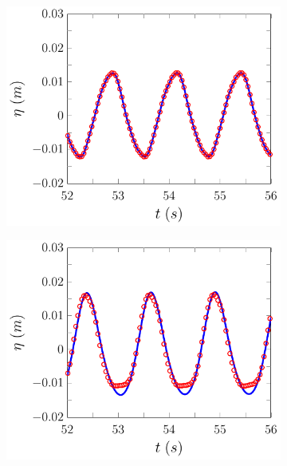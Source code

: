 \begin{figure}
	\centering
	\begin{subfigure}{0.5\textwidth}
		\includegraphics[width=\textwidth]{./chp6/figures/Experiment/Beji/sh/FEVMWG1.pdf}
		\vspace{0.5cm}
	\end{subfigure}%
	\begin{subfigure}{0.5\textwidth}
		\includegraphics[width=\textwidth]{./chp6/figures/Experiment/Beji/sh/FEVMWG2.pdf}
		\vspace{0.5cm}
	\end{subfigure}

\end{figure}
